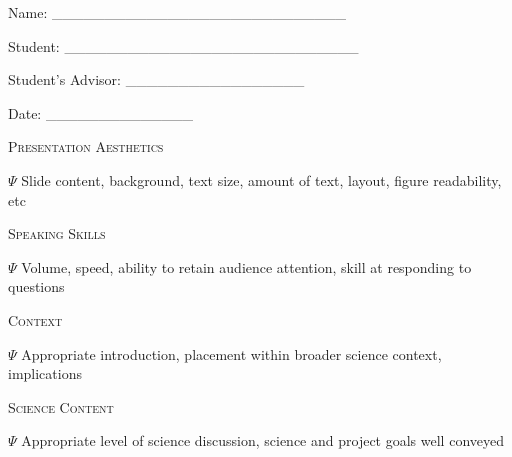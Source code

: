\documentclass{article}
\begin{document}
\baselineskip=18pt
{\Large{}Name: \_\_\_\_\_\_\_\_\_\_\_\_\_\_\_\_\_\_\_\_\_\_\_\_\_\_\_\_}

{\Large{}Student: \_\_\_\_\_\_\_\_\_\_\_\_\_\_\_\_\_\_\_\_\_\_\_\_\_\_\_\_}

{\Large{}Student's Advisor: \_\_\_\_\_\_\_\_\_\_\_\_\_\_\_\_\_}

{\Large{}Date: \_\_\_\_\_\_\_\_\_\_\_\_\_\_}\newpage

\newpage
\vspace{18pt}
{\large{}\textsc{Presentation Aesthetics}}

$\Psi$ Slide content, background, text size, amount of text, layout, figure readability, 
etc

\vspace{126pt}
{\large{}\textsc{Speaking Skills}}

$\Psi$ Volume, speed, ability to retain audience attention, skill at responding 
to questions

\vspace{126pt}
{\large{}\textsc{Context}}

$\Psi$ Appropriate introduction, placement within broader science context, implications

\vspace{126pt}
{\large{}\textsc{Science Content}}

$\Psi$ Appropriate level of science discussion, science and project goals well 
conveyed

\newpage
\end{document}

